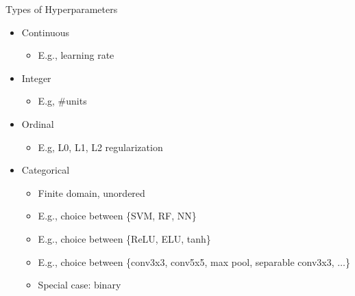
\begin{frame}[c]{Types of Hyperparameters}
\begin{itemize}
	\item Continuous
	\begin{itemize}
		\item E.g., learning rate
	\end{itemize}
	\item Integer
	\begin{itemize}
		\item E.g, \#units
	\end{itemize}
	\item Ordinal
	\begin{itemize}
		\item E.g, L0, L1, L2 regularization
	\end{itemize}
	\item \alert{Categorical}
	\begin{itemize}
		\item Finite domain, unordered
		\item E.g., choice between \{SVM, RF, NN\}
		\item E.g., choice between \{ReLU, ELU, tanh\}
		\item E.g., choice between \{conv3x3, conv5x5, max pool, separable conv3x3, $\ldots$\}
		\item Special case: binary
	\end{itemize}
\end{itemize}
\end{frame}

